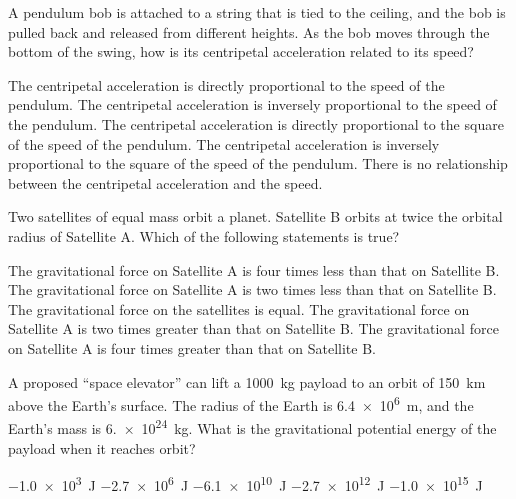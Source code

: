 \documentclass{../../../oss-ap12ibhl-print}
\begin{document}
\begin{questions}
  \question A pendulum bob is attached to a string that is tied to the ceiling,
  and the bob is pulled back and released from different heights. As the bob
  moves through the bottom of the swing, how is its centripetal acceleration
  related to its speed?
  \begin{choices}
    \choice The centripetal acceleration is directly proportional to the speed
    of the pendulum.
    \choice The centripetal acceleration is inversely proportional to the speed
    of the pendulum.
    \choice The centripetal acceleration is directly proportional to the square
    of the speed of the pendulum.
    \choice The centripetal acceleration is inversely proportional to the square
    of the speed of the pendulum.
    \choice There is no relationship between the centripetal acceleration and
    the speed.
  \end{choices}
  \vspace{.7in}
  
  \question Two satellites of equal mass orbit a planet. Satellite B orbits at
  twice the orbital radius of Satellite A. Which of the following statements is
  true?
  \begin{choices}
    \choice The gravitational force on Satellite A is four times less than that
    on Satellite B.
    \choice The gravitational force on Satellite A is two times less than that
    on Satellite B.
    \choice The gravitational force on the satellites is equal.
    \choice The gravitational force on Satellite A is two times greater than
    that on Satellite B.
    \choice The gravitational force on Satellite A is four times greater than
    that on Satellite B.
  \end{choices}
    
  \question A proposed ``space elevator'' can lift a \SI{1000}{\kilo\gram}
  payload to an orbit of \SI{150}{\kilo\metre} above the Earth's surface. The
  radius of the Earth is \SI{6.4e6}{\metre}, and the Earth's mass is
  \SI{6.e24}{\kilo\gram}. What is the gravitational potential energy of the
  payload when it reaches orbit?
  \begin{choices}
    \choice\SI{-1.0e3}{\joule}
    \choice\SI{-2.7e6}{\joule}
    \choice\SI{-6.1e10}{\joule}
    \choice\SI{-2.7e12}{\joule}
    \choice\SI{-1.0e15}{\joule}
  \end{choices}

  

\end{questions}
\end{document}
